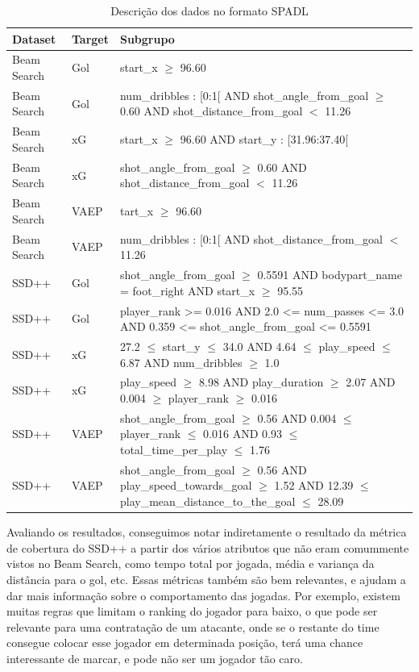 \documentclass{article}
\begin{document}
\begin{table}[H]
	\centering
	\label{tab:resultAlgoritms}
	\begin{tabular}{|l|l|l|}
		\hline
		\textbf{Dataset} & \textbf{Target} & 
		\textbf{Subgrupo}
		\\
		\hline
		Beam Search & Gol & start_x $\geq$ 96.60
		\\
		\hline
		Beam Search & Gol & num\_dribbles : [0:1[ AND shot\_angle\_from\_goal $\geq$ 0.60 
		AND shot\_distance\_from\_goal $<$ 11.26
		\\
		\hline
		Beam Search & xG & start_x $\geq$ 96.60 AND start\_y : [31.96:37.40[
		\\
		\hline
		Beam Search & xG & shot\_angle\_from\_goal $\geq$ 0.60 AND shot\_distance\_from\_goal $<$ 11.26
		\\
		\hline
		Beam Search & VAEP & tart_x $\geq$ 96.60
		\\
		\hline
		Beam Search & VAEP & num\_dribbles : [0:1[  AND shot\_distance\_from\_goal $<$ 11.26
		\\
		\hline
		SSD++ & Gol & shot\_angle\_from_goal $\geq$ 0.5591 AND bodypart\_name = foot\_right 
		AND start\_x $\geq$ 95.55
		\\
		\hline
		SSD++ & Gol & player\_rank >= 0.016 AND 2.0 <= num\_passes <= 3.0 AND 
		0.359 <= shot\_angle\_from\_goal <= 0.5591
		\\
		\hline
		SSD++ & xG & 27.2 $\leq$ start_y $\leq$ 34.0 AND 4.64 $\leq$ play_speed $\leq$ 6.87 
		AND num_dribbles $\geq$ 1.0
		\\
		\hline
		SSD++ & xG & play\_speed $\geq$ 8.98 AND play\_duration $\geq$ 2.07 
		AND 0.004 $\geq$ player\_rank $\geq$ 0.016
		\\
		\hline
		SSD++ & VAEP & shot\_angle\_from\_goal $\geq$ 0.56 AND 
		0.004 $\leq$ player\_rank $\leq$ 0.016 AND 0.93 $\leq$ total\_time\_per\_play $\leq$ 1.76
		\\
		\hline
		SSD++ & VAEP & shot\_angle\_from\_goal $\geq$ 0.56 AND play\_speed\_towards\_goal $\geq$ 1.52 
		AND 12.39 $\leq$ play\_mean\_distance\_to\_the\_goal $\leq$ 28.09
		\\
		\hline
	\end{tabular}
	\caption{Descrição dos dados no formato SPADL}
\end{table}

Avaliando os resultados, conseguimos notar indiretamente o resultado da métrica de cobertura 
do SSD++ a partir dos vários atributos que não eram comummente vistos no Beam Search, como tempo 
total por jogada, média e variança da distância para o gol, etc. Essas métricas também são bem 
relevantes, e ajudam a dar mais informação sobre o comportamento das jogadas. Por exemplo, existem 
muitas regras que limitam o ranking do jogador para baixo, o que pode ser relevante para uma contratação 
de um atacante, onde se o restante do time consegue colocar esse jogador em determinada posição, terá uma 
chance interessante de marcar, e pode não ser um jogador tão caro.
\end{document}
